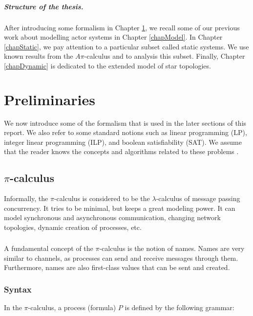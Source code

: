 \documentclass[a4paper]{report}
\numberwithin{algorithm}{chapter}
\begin{document}
\paragraph{Structure of the thesis.}
After introducing some formalism in Chapter \ref{chapPrem}, we recall some of our previous work about modelling actor systems in Chapter \ref{chapModel}.
In Chapter \ref{chapStatic}, we pay attention to a particular subset called static systems.
We use known results from the $A\pi$-calculus and \pns{} to analysis this subset.
Finally, Chapter \ref{chapDynamic} is dedicated to the extended model of star topologies.


\chapter{Preliminaries}
\label{chapPrem}
We now introduce some of the formalism that is used in the later sections of this report.
We also refer to some standard notions such as linear programming (LP), integer linear programming (ILP), and boolean satisfiability (SAT).
We assume that the reader knows the concepts and algorithms related to these problems \cite{decision_procedure}.


\section{$\pi$-calculus}
Informally, the $\pi$-calculus\cite{DBLP:journals/iandc/MilnerPW92a,DBLP:journals/iandc/MilnerPW92b} is considered to be the $\lambda$-calculus of message passing concurrency.
It tries to be minimal, but keeps a great modeling power.
It can model synchronous and asynchronous communication, changing network topologies, dynamic creation of processes, etc.

\paragraph{}
A fundamental concept of the $\pi$-calculus is the notion of names.
Names are very similar to channels, as processes can send and receive messages through them.
Furthermore, names are also first-class values that can be sent and created.

\subsection{Syntax}

In the $\pi$-calculus, a process (formula) $P$ is defined by the following grammar:
\end{document}
